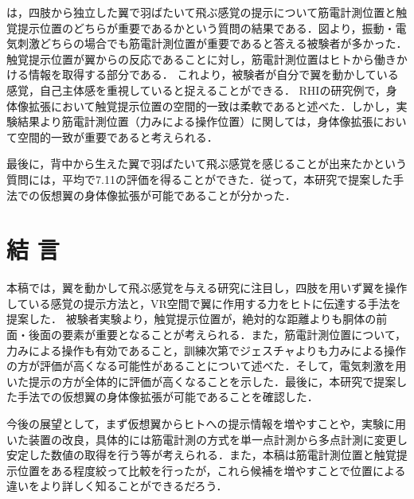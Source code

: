 \begin{small}
        は，四肢から独立した翼で羽ばたいて飛ぶ感覚の提示について筋電計測位置と触覚提示位置のどちらが重要であるかという質問の結果である．図より，振動・電気刺激どちらの場合でも筋電計測位置が重要であると答える被験者が多かった．
        触覚提示位置が翼からの反応であることに対し，筋電計測位置はヒトから働きかける情報を取得する部分である．
        これより，被験者が自分で翼を動かしている感覚，自己主体感を重視していると捉えることができる．
        RHIの研究例で，身体像拡張において触覚提示位置の空間的一致は柔軟であると述べた．しかし，実験結果より筋電計測位置（力みによる操作位置）に関しては，身体像拡張において空間的一致が重要であると考えられる．


        最後に，背中から生えた翼で羽ばたいて飛ぶ感覚を感じることが出来たかという質問には，平均で7.11の評価を得ることができた．従って，本研究で提案した手法での仮想翼の身体像拡張が可能であることが分かった．


\section{結   言}
    本稿では，翼を動かして飛ぶ感覚を与える研究に注目し，四肢を用いず翼を操作している感覚の提示方法と，VR空間で翼に作用する力をヒトに伝達する手法を提案した．
    被験者実験より，触覚提示位置が，絶対的な距離よりも胴体の前面・後面の要素が重要となることが考えられる．また，筋電計測位置について，力みによる操作も有効であること，訓練次第でジェスチャよりも力みによる操作の方が評価が高くなる可能性があることについて述べた．そして，電気刺激を用いた提示の方が全体的に評価が高くなることを示した．最後に，本研究で提案した手法での仮想翼の身体像拡張が可能であることを確認した．
    
    今後の展望として，まず仮想翼からヒトへの提示情報を増やすことや，実験に用いた装置の改良，具体的には筋電計測の方式を単一点計測から多点計測に変更し安定した数値の取得を行う等が考えられる．また，本稿は筋電計測位置と触覚提示位置をある程度絞って比較を行ったが，これら候補を増やすことで位置による違いをより詳しく知ることができるだろう．
  


\end{small}
